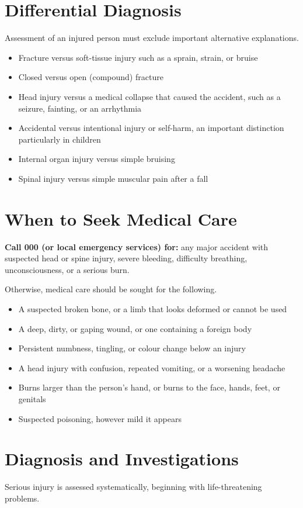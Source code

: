 \section*{Differential Diagnosis}
Assessment of an injured person must exclude important alternative explanations.

\begin{itemize}
    \item Fracture versus soft-tissue injury such as a sprain, strain, or bruise
    \item Closed versus open (compound) fracture
    \item Head injury versus a medical collapse that caused the accident, such as a seizure, fainting, or an arrhythmia
    \item Accidental versus intentional injury or self-harm, an important distinction particularly in children
    \item Internal organ injury versus simple bruising
    \item Spinal injury versus simple muscular pain after a fall
\end{itemize}

\section*{When to Seek Medical Care}
\textbf{Call 000 (or local emergency services) for:} any major accident with suspected head or spine injury, severe bleeding, difficulty breathing, unconsciousness, or a serious burn.

Otherwise, medical care should be sought for the following.

\begin{itemize}
    \item A suspected broken bone, or a limb that looks deformed or cannot be used
    \item A deep, dirty, or gaping wound, or one containing a foreign body
    \item Persistent numbness, tingling, or colour change below an injury
    \item A head injury with confusion, repeated vomiting, or a worsening headache
    \item Burns larger than the person's hand, or burns to the face, hands, feet, or genitals
    \item Suspected poisoning, however mild it appears
\end{itemize}

\section*{Diagnosis and Investigations}
Serious injury is assessed systematically, beginning with life-threatening problems.

